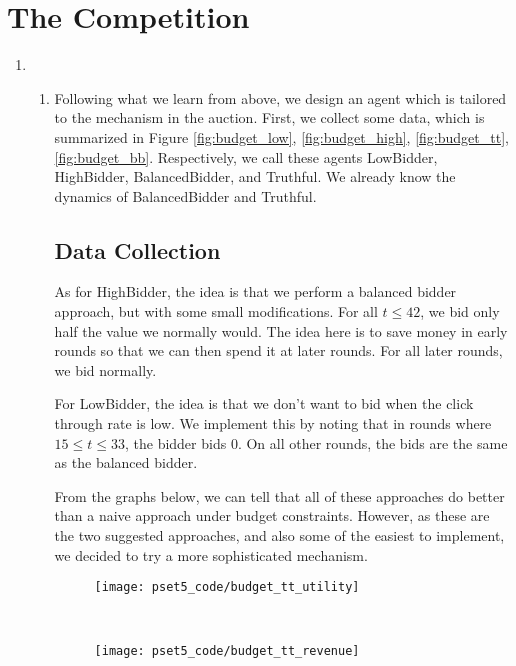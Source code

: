 \documentclass[11pt]{article}
\begin{document}
\section*{The Competition}
\begin{enumerate}[resume]
\item
  \begin{enumerate}
  \item Following what we learn from above, we design an agent which is tailored to the mechanism in the auction. First, we collect some data, which is summarized in Figure \ref{fig:budget_low}, \ref{fig:budget_high}, \ref{fig:budget_tt}, \ref{fig:budget_bb}. Respectively, we call these agents LowBidder, HighBidder, BalancedBidder, and Truthful. We already know the dynamics of BalancedBidder and Truthful.

  \subsection*{Data Collection}

  As for HighBidder, the idea is that we perform a balanced bidder approach, but with some small modifications. For all $t \leq 42$, we bid only half the value we normally would. The idea here is to save money in early rounds so that we can then spend it at later rounds. For all later rounds, we bid normally.

  For LowBidder, the idea is that we don't want to bid when the click through rate is low. We implement this by noting that in rounds where $15 \leq t \leq 33$, the bidder bids $0$. On all other rounds, the bids are the same as the balanced bidder.

  From the graphs below, we can tell that all of these approaches do better than a naive approach under budget constraints. However, as these are the two suggested approaches, and also some of the easiest to implement, we decided to try a more sophisticated mechanism.

  \begin{figure*}[!h]
    \centering
      \begin{subfigure}{}
        \centering
        \texttt{[image: pset5\_code/budget\_tt\_utility]}
      \end{subfigure}
      ~
      \begin{subfigure}{}
        \centering
        \texttt{[image: pset5\_code/budget\_tt\_revenue]}
      \end{subfigure}
      \caption{Left: Utility for a population of truthful bidders with \$600 budget constraint. Right: revenue.}
      \label{fig:budget_tt}
  \end{figure*}


\end{enumerate}
\end{enumerate}
\end{document}
